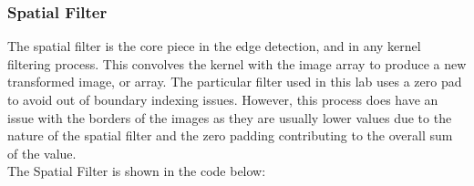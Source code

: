 \documentclass{article}
\begin{document}
	\subsubsection{Spatial Filter}
	
	The spatial filter is the core piece in the edge detection, and in any kernel filtering process. This convolves the kernel with the image array to produce a new transformed image, or array. The particular filter used in this lab uses a zero pad to avoid out of boundary indexing issues. However, this process does have an issue with the borders of the images as they are usually lower values due to the nature of the spatial filter and the zero padding contributing to the overall sum of the value.\\
	
	The Spatial Filter is shown in the code below:\\
	
\end{document}
